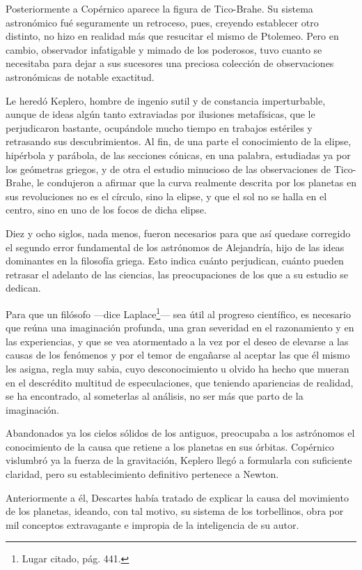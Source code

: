 \documentclass[a4paper, 12pt]{article}
\begin{document}
Posteriormente a Copérnico aparece la figura de Tico-Brahe. Su sistema astronómico fué seguramente un retroceso, pues, creyendo establecer otro distinto, no hizo en realidad más que resucitar el mismo de Ptolemeo. Pero en cambio, observador infatigable y mimado de los poderosos, tuvo cuanto se necesitaba para dejar a sus sucesores una preciosa colección de observaciones astronómicas de notable exactitud.

Le heredó Keplero, hombre de ingenio sutil y de constancia imperturbable, aunque de ideas algún tanto extraviadas por ilusiones metafísicas, que le perjudicaron bastante, ocupándole mucho tiempo en trabajos estériles y retrasando sus descubrimientos. Al fin, de una parte el conocimiento de la elipse, hipérbola y parábola, de las secciones cónicas, en una palabra, estudiadas ya por los geómetras griegos, y de otra el estudio minucioso de las observaciones de Tico-Brahe, le condujeron a afirmar que la curva realmente descrita por los planetas en sus revoluciones no es el círculo, sino la elipse, y que el sol no se halla en el centro, sino en uno de los focos de dicha elipse.

Diez y ocho siglos, nada menos, fueron necesarios para que así quedase corregido el segundo error fundamental de los astrónomos de Alejandría, hijo de las ideas dominantes en la filosofía griega. Esto indica cuánto perjudican, cuánto pueden retrasar el adelanto de las ciencias, las preocupaciones de los que a su estudio se dedican.

Para que un filósofo ---dice Laplace\footnote{Lugar citado, pág. 441.}--- sea útil al progreso científico, es necesario que reúna una imaginación profunda, una gran severidad en el razonamiento y en las experiencias, y que se vea atormentado a la vez por el deseo de elevarse a las causas de los fenómenos y por el temor de engañarse al aceptar las que él mismo les asigna, regla muy sabia, cuyo desconocimiento u olvido ha hecho que mueran en el descrédito multitud de especulaciones, que teniendo apariencias de realidad, se ha encontrado, al someterlas al análisis, no ser más que parto de la imaginación.



Abandonados ya los cielos sólidos de los antiguos, preocupaba a los astró\-nomos el conocimiento de la causa que retiene a los planetas en sus órbitas. Copérnico vislumbró ya la fuerza de la gravitación, Keplero llegó a formularla con suficiente claridad, pero su establecimiento definitivo pertenece a Newton.

Anteriormente a él, Descartes había tratado de explicar la causa del movimiento de los planetas, ideando, con tal motivo, su sistema de los torbellinos, obra por mil conceptos extravagante e impropia de la inteligencia de su autor.
\end{document}
